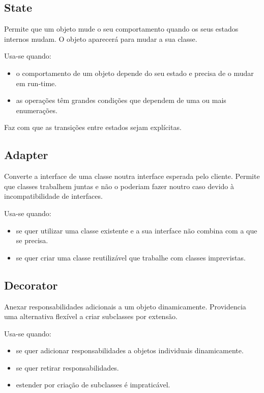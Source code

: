 \documentclass[../resumosLPOO.tex]{subfiles}
\begin{document}
\subsection{State}

Permite que um objeto mude o seu comportamento quando os seus estados internos mudam. O objeto aparecerá para mudar a sua classe.

Usa-se quando:
\begin{itemize}
    \item o comportamento de um objeto depende do seu estado e precisa de o mudar em run-time.
    \item as operações têm grandes condições que dependem de uma ou mais enumerações.
\end{itemize}

Faz com que as transições entre estados sejam explícitas.


\subsection{Adapter}

Converte a interface de uma classe noutra interface esperada pelo cliente. Permite que classes trabalhem juntas e não o poderiam fazer noutro caso devido à incompatibilidade de interfaces.

Usa-se quando:
\begin{itemize}
    \item se quer utilizar uma classe existente e a sua interface não combina com a que se precisa.
    \item se quer criar uma classe reutilizável que trabalhe com classes imprevistas.
\end{itemize}


\subsection{Decorator}

Anexar responsabilidades adicionais a um objeto dinamicamente. Providencia uma alternativa flexível a criar subclasses por extensão.

Usa-se quando:
\begin{itemize}
    \item se quer adicionar responsabilidades a objetos individuais dinamicamente.
    \item se quer retirar responsabilidades.
    \item estender por criação de subclasses é impraticável.
\end{itemize}
\end{document}
